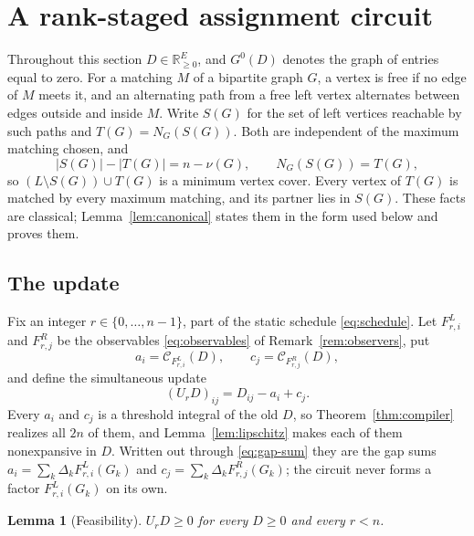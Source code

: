 \documentclass[11pt]{article}
\newtheorem{lemma}[theorem]{Lemma}
\begin{document}
\section{A rank-staged assignment circuit}
\label{sec:circuit}

Throughout this section $D\in\mathbb R_{\ge0}^{E}$, and $G^{0}(D)$ denotes the
graph of entries equal to zero.  For a matching $M$ of a bipartite graph $G$, a
vertex is free if no edge of $M$ meets it, and an alternating path from a free
left vertex alternates between edges outside and inside $M$.  Write $S(G)$ for
the set of left vertices reachable by such paths and $T(G)=N_G(S(G))$.  Both are
independent of the maximum matching chosen, and
\begin{equation}
  |S(G)|-|T(G)|=n-\nu(G),
  \qquad
  N_G(S(G))=T(G),
  \label{eq:cover}
\end{equation}
so $(L\setminus S(G))\cup T(G)$ is a minimum vertex cover.  Every vertex of
$T(G)$ is matched by every maximum matching, and its partner lies in $S(G)$.
These facts are classical; Lemma~\ref{lem:canonical} states them in the form
used below and proves them.

\subsection{The update}

Fix an integer $r\in\{0,\ldots,n-1\}$, part of the static schedule
\eqref{eq:schedule}.  Let $F^{L}_{r,i}$ and $F^{R}_{r,j}$ be the observables
\eqref{eq:observables} of Remark~\ref{rem:observers}, put
\begin{equation}
  a_i=\mathcal C_{F^{L}_{r,i}}(D),
  \qquad
  c_j=\mathcal C_{F^{R}_{r,j}}(D),
  \label{eq:ac}
\end{equation}
and define the simultaneous update
\begin{equation}
  (U_rD)_{ij}=D_{ij}-a_i+c_j .
  \label{eq:update}
\end{equation}
Every $a_i$ and $c_j$ is a threshold integral of the old $D$, so
Theorem~\ref{thm:compiler} realizes all $2n$ of them, and
Lemma~\ref{lem:lipschitz} makes each of them nonexpansive in $D$.  Written out
through \eqref{eq:gap-sum} they are the gap sums
$a_i=\sum_k\Delta_kF^{L}_{r,i}(G_k)$ and $c_j=\sum_k\Delta_kF^{R}_{r,j}(G_k)$;
the circuit never forms a factor $F^{L}_{r,i}(G_k)$ on its own.

\begin{lemma}[Feasibility]
\label{lem:feasible}
$U_rD\ge0$ for every $D\ge0$ and every $r<n$.
\end{lemma}
\end{document}
